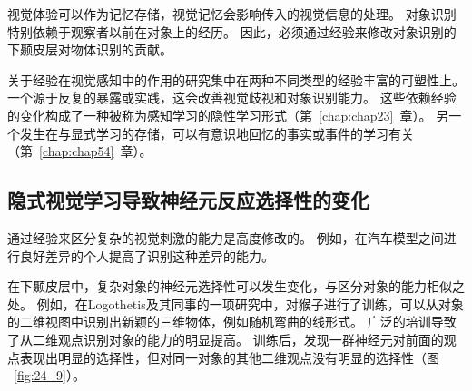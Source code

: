 视觉体验可以作为记忆存储，视觉记忆会影响传入的视觉信息的处理。
对象识别特别依赖于观察者以前在对象上的经历。
因此，必须通过经验来修改对象识别的下颞皮层对物体识别的贡献。


关于经验在视觉感知中的作用的研究集中在两种不同类型的经验丰富的可塑性上。
一个源于反复的暴露或实践，这会改善视觉歧视和对象识别能力。
这些依赖经验的变化构成了一种被称为感知学习的隐性学习形式（第~\ref{chap:chap23}~章）。
另一个发生在与显式学习的存储，可以有意识地回忆的事实或事件的学习有关（第~\ref{chap:chap54}~章）。



\subsection{隐式视觉学习导致神经元反应选择性的变化}

通过经验来区分复杂的视觉刺激的能力是高度修改的。
例如，在汽车模型之间进行良好差异的个人提高了识别这种差异的能力。


在下颞皮层中，复杂对象的神经元选择性可以发生变化，与区分对象的能力相似之处。
例如，在Logothetis及其同事的一项研究中，对猴子进行了训练，可以从对象的二维视图中识别出新颖的三维物体，例如随机弯曲的线形式。
广泛的培训导致了从二维观点识别对象的能力的明显提高。
训练后，发现一群神经元对前面的观点表现出明显的选择性，但对同一对象的其他二维观点没有明显的选择性（图 ~\ref{fig:24_9}）。


